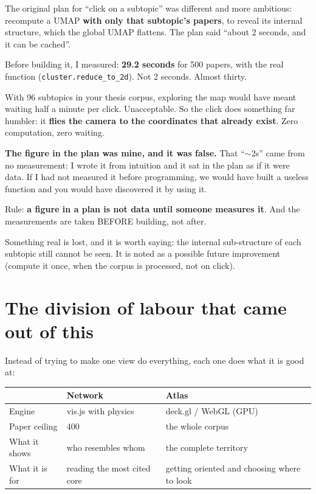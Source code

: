\documentclass[11pt,a4paper]{article}
\begin{document}
The original plan for ``click on a subtopic'' was different and more ambitious: recompute a
UMAP \textbf{with only that subtopic's papers}, to reveal its internal structure, which the
global UMAP flattens. The plan said ``about 2 seconds, and it can be cached''.

Before building it, I measured: \textbf{29.2 seconds} for 500 papers, with the real function
(\texttt{cluster.reduce\_to\_2d}). Not 2 seconds. Almost thirty.

With 96 subtopics in your thesis corpus, exploring the map would have meant waiting half a
minute per click. Unacceptable. So the click does something far humbler: it \textbf{flies the
camera to the coordinates that already exist}. Zero computation, zero waiting.

\begin{ojo}
\textbf{The figure in the plan was mine, and it was false.} That ``$\sim$2s'' came from no measurement: I wrote it from intuition and it sat in the plan as
if it were data. If I had not measured it before programming, we would have built a useless
function and you would have discovered it by using it.

Rule: \textbf{a figure in a plan is not data until someone measures it}. And the measurements
are taken BEFORE building, not after.
\end{ojo}

Something real is lost, and it is worth saying: the internal sub-structure of each subtopic
still cannot be seen. It is noted as a possible future improvement (compute it once, when the
corpus is processed, not on click).

\section{The division of labour that came out of this}

Instead of trying to make one view do everything, each one does what it is good at:

\begin{center}
\begin{tabular}{lll}
\hline
 & \textbf{Network} & \textbf{Atlas} \\
\hline
Engine        & vis.js with physics    & deck.gl / WebGL (GPU) \\
Paper ceiling & 400                    & the whole corpus \\
What it shows & who resembles whom     & the complete territory \\
What it is for & reading the most cited core & getting oriented and choosing where to look \\
\hline
\end{tabular}
\end{center}
\end{document}

